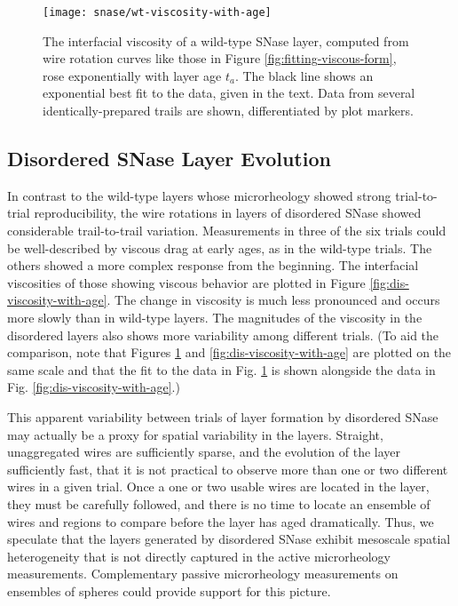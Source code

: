    \begin{figure}
    \centering
    \texttt{[image: snase/wt-viscosity-with-age]}
    \caption{\label{fig:wt-viscosity-with-age}The interfacial viscosity of a wild-type SNase layer, computed from wire rotation curves like those in Figure \ref{fig:fitting-viscous-form}, rose exponentially with layer age $t_a$. The black line shows an exponential best fit to the data, given in the text. Data from several identically-prepared trails are shown, differentiated by plot markers.}
    \end{figure}
   

\subsection{Disordered SNase Layer Evolution}

In contrast to the wild-type layers whose microrheology showed strong trial-to-trial reproducibility, the wire rotations in layers of disordered SNase showed considerable trail-to-trail variation. Measurements in three of the six trials could be well-described by viscous drag at early ages, as in the wild-type trials. The others showed a more complex response from the beginning. The interfacial viscosities of those showing viscous behavior are plotted in Figure \ref{fig:dis-viscosity-with-age}. The change in viscosity is much less pronounced and occurs more slowly than in wild-type layers. The magnitudes of the viscosity in the disordered layers also shows more variability among different trials. (To aid the comparison, note that Figures \ref{fig:wt-viscosity-with-age} and \ref{fig:dis-viscosity-with-age} are plotted on the same scale and that the fit to the data in Fig. \ref{fig:wt-viscosity-with-age} is shown alongside the data in Fig. \ref{fig:dis-viscosity-with-age}.)

This apparent variability between trials of layer formation by disordered SNase may actually be a proxy for spatial variability in the layers. Straight, unaggregated wires are sufficiently sparse, and the evolution of the layer sufficiently fast, that it is not practical to observe more than one or two different wires in a given trial. Once a one or two usable wires are located in the layer, they must be carefully followed, and there is no time to locate an ensemble of wires and regions to compare before the layer has aged dramatically. Thus, we speculate that the layers generated by disordered SNase exhibit mesoscale spatial heterogeneity that is not directly captured in the active microrheology measurements. Complementary passive microrheology measurements on ensembles of spheres could provide support for this picture.

